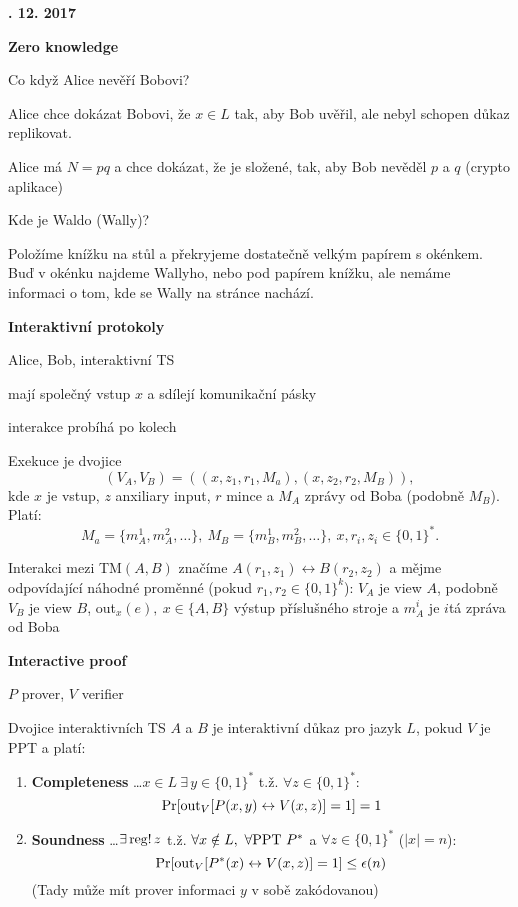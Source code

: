 \documentclass[a4paper,12pt,titlepage]{article}
\def\podnadpis#1{{\bigskip\bf\noindent#1\medskip\par}}
\begin{document}
\podnadpis{21. 12. 2017}

\podnadpis{Zero knowledge}

Co když Alice nevěří Bobovi?

\noindent Alice chce dokázat Bobovi, že $x\in L$ tak, aby Bob uvěřil, ale nebyl schopen důkaz replikovat.

\noindent Alice má $N=pq$ a chce dokázat, že je složené, tak, aby Bob nevěděl $p$ a $q$ (crypto aplikace)

\noindent Kde je Waldo (Wally)?

Položíme knížku na stůl a překryjeme dostatečně velkým papírem s okénkem. Buď v okénku najdeme Wallyho, nebo pod papírem knížku, ale nemáme informaci o tom, kde se Wally na stránce nachází.

\podnadpis{Interaktivní protokoly}

Alice, Bob, interaktivní TS

mají společný vstup $x$ a sdílejí komunikační pásky

interakce probíhá po kolech

Exekuce je dvojice
$$(V_A,V_B)=((x,z_1,r_1,M_a),(x,z_2,r_2,M_B)),$$
kde $x$ je vstup, $z$ anxiliary input, $r$ mince a $M_A$ zprávy od Boba (podobně $M_B$). Platí:
$$M_a=\{m_A^1,m_A^2, \dots\},\ M_B=\{m_B^1,m_B^2, \dots\},\ x,r_i,z_i\in \{0,1\}^*.$$

Interakci mezi TM$(A,B)$ značíme $A(r_1,z_1)\leftrightarrow B(r_2,z_2)$ a mějme odpovídající náhodné proměnné (pokud $r_1,r_2\in \{0,1\}^k$): $V_A$ je view $A$, podobně $V_B$ je view $B$, out$_x(e),\ x\in\{A,B\}$ výstup příslušného stroje a $m^i_A$ je $i$tá zpráva od Boba

\podnadpis{Interactive proof}

$P$ prover, $V$ verifier

Dvojice interaktivních TS $A$ a $B$ je interaktivní důkaz pro jazyk $L$, pokud $V$ je PPT a platí:

\begin{enumerate}

\item {\bf Completeness} \dots $x\in L\ \exists\, y\in\{0,1\}^*$ t.ž. $\forall z\in\{0,1\}^*:$
$${\rm Pr}[{\rm out}_V[P(x,y)\leftrightarrow V(x,z)]=1]=1$$
\item {\bf Soundness} \dots $\exists\, {\rm reg}!\, z$ t.ž. $\forall x\notin L,\ \forall {\rm PPT\ } P^*$ a $\forall z\in\{0,1\}^*$ ($|x|=n$):
$${\rm Pr}[{\rm out}_V[P^*(x)\leftrightarrow V(x,z)]=1]\leq\epsilon(n)$$(Tady může mít prover informaci $y$ v sobě zakódovanou)

\end{enumerate}
\end{document}
